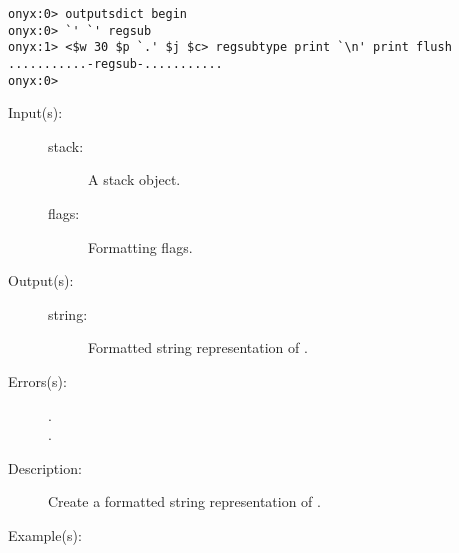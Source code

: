 \begin{description}
\begin{description}
\begin{verbatim}
onyx:0> outputsdict begin
onyx:0> `' `' regsub
onyx:1> <$w 30 $p `.' $j $c> regsubtype print `\n' print flush
...........-regsub-...........
onyx:0>
		\end{verbatim}
	\end{description}
\label{outputsdict:stacktype}
\item[{\onyxop{stack flags}{stacktype}{string}}: ]
	\begin{description}\item[]
	\item[Input(s): ]
		\begin{description}\item[]
		\item[stack: ]
			A stack object.
		\item[flags: ]
			Formatting flags.
		\end{description}
	\item[Output(s): ]
		\begin{description}\item[]
		\item[string: ]
			Formatted string representation of .
		\end{description}
	\item[Errors(s): ]
		\begin{description}\item[]
		\item[.]
		\item[.]
		\end{description}
	\item[Description: ]
		Create a formatted string representation of .
	\item[Example(s): ]\begin{verbatim}


\end{verbatim}
\end{description}
\end{description}
